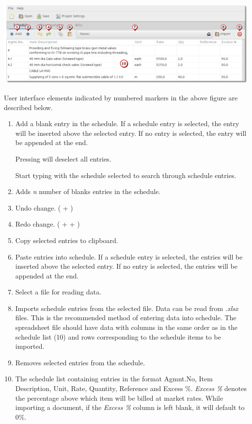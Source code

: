 \documentclass[twoside,a4paper]{refart}
\newenvironment{noteblock}[1]%
{\begin{mdframed}[topline=false,bottomline=false, rightline=false,
		linewidth=2pt, frametitle={#1}]}%
		{\end{mdframed}}
\begin{document}
	 \begin{maxipage}
	 	\includegraphics[width=1\linewidth]{screenshots/window_sch.png}
	 \end{maxipage}
	 
	 User interface elements indicated by numbered markers in the above figure are described below.
	 
	 \begin{enumerate}
	 	\item Add a blank entry in the schedule. If a schedule entry is selected, the entry will be inserted above the selected entry. If no entry is selected, the entry will be appended at the end.\\
	 	\begin{noteblock}{Tips!}
	 		Pressing  will deselect all entries.
	 		
	 		Start typing with the schedule selected to search through schedule entries.
	 	\end{noteblock}
	 	\item Adds \emph{n} number of blanks entries in the schedule.
	 	\item Undo change. ( + )
	 	\item Redo change. ( +  + )	 
	 	\item Copy selected entries to clipboard.
	 	\item Paste entries into schedule. If a schedule entry is selected, the entries will be inserted above the selected entry. If no entry is selected, the entries will be appended at the end.
	 	\item Select a file for reading data.
	 	\item \attention Imports schedule entries from the selected file. Data can be read from \emph{.xlsx} files. This is the recommended method of entering data into schedule. The spreadsheet file should have data with columns in the same order as in the schedule list (10) and rows corresponding to the schedule items to be imported.
	 	\item Removes selected entries from the schedule.
	 	\item The schedule list containing entries in the format Agmnt.No, Item Description, Unit, Rate, Quantity, Reference and Excess \%. \emph{Excess \%} denotes the percentage above which item will be billed at market rates. \attention While importing a document, if the \emph{Excess \%} column is left blank, it will default to 0\%.
	 \end{enumerate}
	 
\end{document}
